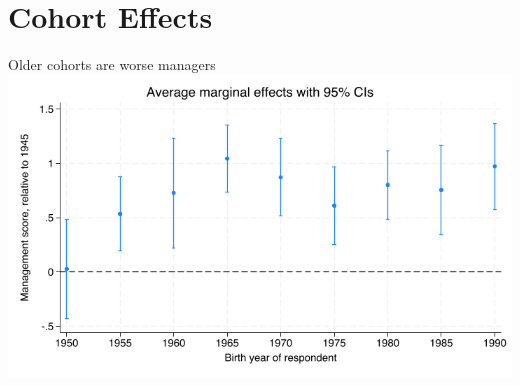 \documentclass[
  ignorenonframetext,
  aspectratio=1610,
]{beamer}
\begin{document}
\section{Cohort Effects}\label{cohort-effects}

\begin{frame}{Older cohorts are worse managers}
\protect\hypertarget{older-cohorts-are-worse-managers}{}
\includegraphics{fig/cohort-resp-marginsplot.png}
\end{frame}
\end{document}

